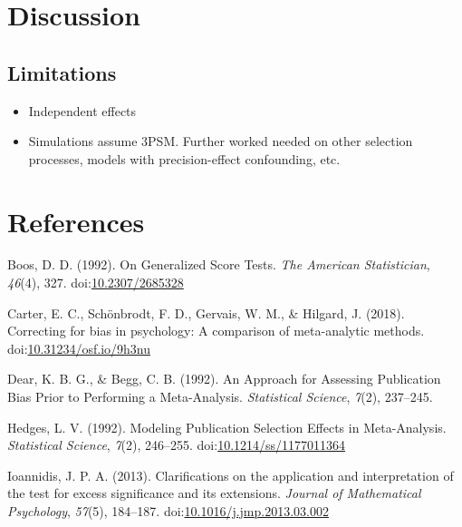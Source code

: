 \documentclass[man,floatsintext]{apa6}
\providecommand{\tightlist}{%
  \setlength{\itemsep}{0pt}\setlength{\parskip}{0pt}}
\begin{document}
\hypertarget{discussion}{%
\section{Discussion}\label{discussion}}

\hypertarget{limitations}{%
\subsection{Limitations}\label{limitations}}

\begin{itemize}
\tightlist
\item
  Independent effects
\item
  Simulations assume 3PSM. Further worked needed on other selection processes, models with precision-effect confounding, etc.
\end{itemize}

\newpage

\hypertarget{references}{%
\section{References}\label{references}}

\begingroup
\setlength{\parindent}{-0.5in}
\setlength{\leftskip}{0.5in}

\hypertarget{refs}{}
\leavevmode\hypertarget{ref-boos1992GeneralizedScoreTests}{}%
Boos, D. D. (1992). On Generalized Score Tests. \emph{The American Statistician}, \emph{46}(4), 327. doi:\href{https://doi.org/10.2307/2685328}{10.2307/2685328}

\leavevmode\hypertarget{ref-carter2018CorrectingBiasPsychology}{}%
Carter, E. C., Schönbrodt, F. D., Gervais, W. M., \& Hilgard, J. (2018). Correcting for bias in psychology: A comparison of meta-analytic methods. doi:\href{https://doi.org/10.31234/osf.io/9h3nu}{10.31234/osf.io/9h3nu}

\leavevmode\hypertarget{ref-dear1992ApproachAssessingPublication}{}%
Dear, K. B. G., \& Begg, C. B. (1992). An Approach for Assessing Publication Bias Prior to Performing a Meta-Analysis. \emph{Statistical Science}, \emph{7}(2), 237--245.

\leavevmode\hypertarget{ref-hedges1992ModelingPublicationSelection}{}%
Hedges, L. V. (1992). Modeling Publication Selection Effects in Meta-Analysis. \emph{Statistical Science}, \emph{7}(2), 246--255. doi:\href{https://doi.org/10.1214/ss/1177011364}{10.1214/ss/1177011364}

\leavevmode\hypertarget{ref-ioannidis2013ClarificationsApplicationInterpretation}{}%
Ioannidis, J. P. A. (2013). Clarifications on the application and interpretation of the test for excess significance and its extensions. \emph{Journal of Mathematical Psychology}, \emph{57}(5), 184--187. doi:\href{https://doi.org/10.1016/j.jmp.2013.03.002}{10.1016/j.jmp.2013.03.002}
\end{document}
